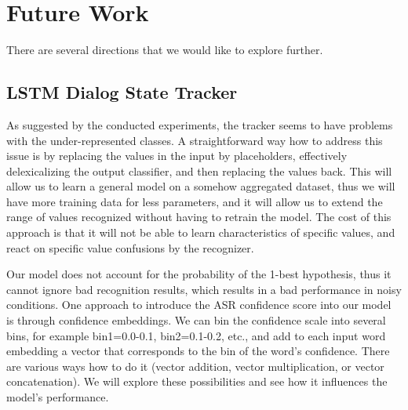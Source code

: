 \documentclass[10pt,twocolumn]{article}
\begin{document}




\section{Future Work}
\label{sec:future_work}
There are several directions that we would like to explore further.

\subsection{LSTM Dialog State Tracker}
As suggested by the conducted experiments, the tracker seems to have problems with the under-represented classes. A straightforward way how to address this issue is by replacing the values in the input by placeholders, effectively delexicalizing the output classifier, and then replacing the values back. This will allow us to learn a general model on a somehow aggregated dataset, thus we will have more training data for less parameters, and it will allow us to extend the range of values recognized without having to retrain the model. The cost of this approach is that it will not be able to learn characteristics of specific values, and react on specific value confusions by the recognizer.

Our model does not account for the probability of the 1-best hypothesis, thus it cannot ignore bad recognition results, which results in a bad performance in noisy conditions. One approach to introduce the ASR confidence score into our model is through confidence embeddings. We can bin the confidence scale into several bins, for example bin1=0.0-0.1, bin2=0.1-0.2, etc., and add to each input word embedding a vector that corresponds to the bin of the word's confidence. There are various ways how to do it (vector addition, vector multiplication, or vector concatenation). We will explore these possibilities and see how it influences the model's performance.
\end{document}
